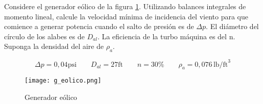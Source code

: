 \item Considere el generador eólico de la figura \ref{fig:eolico}. Utilizando balances integrales de momento lineal, calcule la velocidad mínima de incidencia del viento para que comience a generar potencia cuando el salto de presión es de $\Delta p$. El diámetro del círculo de los alabes  es de $D_{al}$. La eficiencia de la turbo máquina es del n. Suponga la densidad del aire de $\rho_a$.

$$\Delta p = 0,04  \text{psi} \qquad D_{al} = 27 \text{ft} \qquad n = 30 \% \qquad \rho_a = 0,076\,\text{lb/ft}^3 $$

\begin{figure}[h]
\centering
\texttt{[image: g\_eolico.png]}
\caption{Generador eólico}
\label{fig:eolico}
\end{figure}

